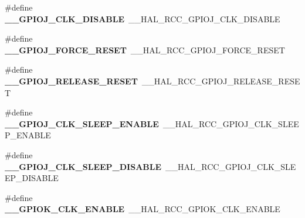 \begin{DoxyCompactItemize}
\item 
\#define {\bfseries \+\_\+\+\_\+\+G\+P\+I\+O\+J\+\_\+\+C\+L\+K\+\_\+\+D\+I\+S\+A\+B\+LE}~\+\_\+\+\_\+\+H\+A\+L\+\_\+\+R\+C\+C\+\_\+\+G\+P\+I\+O\+J\+\_\+\+C\+L\+K\+\_\+\+D\+I\+S\+A\+B\+LE\hypertarget{group___h_a_l___r_c_c___aliased_ga7b65a354e89d6f3b0ca137395f3851bb}{}\label{group___h_a_l___r_c_c___aliased_ga7b65a354e89d6f3b0ca137395f3851bb}

\item 
\#define {\bfseries \+\_\+\+\_\+\+G\+P\+I\+O\+J\+\_\+\+F\+O\+R\+C\+E\+\_\+\+R\+E\+S\+ET}~\+\_\+\+\_\+\+H\+A\+L\+\_\+\+R\+C\+C\+\_\+\+G\+P\+I\+O\+J\+\_\+\+F\+O\+R\+C\+E\+\_\+\+R\+E\+S\+ET\hypertarget{group___h_a_l___r_c_c___aliased_gacd1de4b6619359a03c6fe6cca751f054}{}\label{group___h_a_l___r_c_c___aliased_gacd1de4b6619359a03c6fe6cca751f054}

\item 
\#define {\bfseries \+\_\+\+\_\+\+G\+P\+I\+O\+J\+\_\+\+R\+E\+L\+E\+A\+S\+E\+\_\+\+R\+E\+S\+ET}~\+\_\+\+\_\+\+H\+A\+L\+\_\+\+R\+C\+C\+\_\+\+G\+P\+I\+O\+J\+\_\+\+R\+E\+L\+E\+A\+S\+E\+\_\+\+R\+E\+S\+ET\hypertarget{group___h_a_l___r_c_c___aliased_ga352651a646a83613b70dd39b81e7d81e}{}\label{group___h_a_l___r_c_c___aliased_ga352651a646a83613b70dd39b81e7d81e}

\item 
\#define {\bfseries \+\_\+\+\_\+\+G\+P\+I\+O\+J\+\_\+\+C\+L\+K\+\_\+\+S\+L\+E\+E\+P\+\_\+\+E\+N\+A\+B\+LE}~\+\_\+\+\_\+\+H\+A\+L\+\_\+\+R\+C\+C\+\_\+\+G\+P\+I\+O\+J\+\_\+\+C\+L\+K\+\_\+\+S\+L\+E\+E\+P\+\_\+\+E\+N\+A\+B\+LE\hypertarget{group___h_a_l___r_c_c___aliased_ga6545a12e39e58f09b423f98d40e4e30f}{}\label{group___h_a_l___r_c_c___aliased_ga6545a12e39e58f09b423f98d40e4e30f}

\item 
\#define {\bfseries \+\_\+\+\_\+\+G\+P\+I\+O\+J\+\_\+\+C\+L\+K\+\_\+\+S\+L\+E\+E\+P\+\_\+\+D\+I\+S\+A\+B\+LE}~\+\_\+\+\_\+\+H\+A\+L\+\_\+\+R\+C\+C\+\_\+\+G\+P\+I\+O\+J\+\_\+\+C\+L\+K\+\_\+\+S\+L\+E\+E\+P\+\_\+\+D\+I\+S\+A\+B\+LE\hypertarget{group___h_a_l___r_c_c___aliased_gabd552e9494e8331c78f930d7b6667c5e}{}\label{group___h_a_l___r_c_c___aliased_gabd552e9494e8331c78f930d7b6667c5e}

\item 
\#define {\bfseries \+\_\+\+\_\+\+G\+P\+I\+O\+K\+\_\+\+C\+L\+K\+\_\+\+E\+N\+A\+B\+LE}~\+\_\+\+\_\+\+H\+A\+L\+\_\+\+R\+C\+C\+\_\+\+G\+P\+I\+O\+K\+\_\+\+C\+L\+K\+\_\+\+E\+N\+A\+B\+LE\hypertarget{group___h_a_l___r_c_c___aliased_gaf00d84e5f7050eee401fb7f6e23a69c2}{}\label{group___h_a_l___r_c_c___aliased_gaf00d84e5f7050eee401fb7f6e23a69c2}


\end{DoxyCompactItemize}
